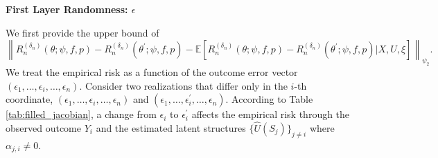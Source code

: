 \documentclass[12pt]{article}
\newcommand{\E}{\mathbb{E}}
\begin{document}
\noindent\textbf{First Layer Randomness: $\epsilon$}

\noindent We first provide the upper bound of 
$$\left\|R_n^{(\delta_n)}(\theta;\psi,f,p)-R_n^{({\delta_n})}(\theta^\prime;\psi,f,p)-\E\left[R_n^{(\delta_n)}(\theta;\psi,f,p)-R_n^{({\delta_n})}(\theta^\prime;\psi,f,p)|X,U,\xi\right]\right\|_{\psi_2}.$$
We treat the empirical risk as a function of the outcome error vector $(\epsilon_1, \ldots,\epsilon_i,\ldots, \epsilon_n)$. Consider two realizations that differ only in the $i$-th coordinate, $(\epsilon_1, \ldots,\epsilon_i,\ldots, \epsilon_n)$ and $(\epsilon_1, \ldots,\epsilon_i^\prime,\ldots, \epsilon_n)$. According to Table \ref{tab:filled_jacobian}, a change from $\epsilon_i$ to $\epsilon_i^\prime$ affects the empirical risk through the observed outcome $Y_i$ and the estimated latent structures $\{\widehat U(S_j)\}_{j\neq i}$ where $\alpha_{j,i}\neq 0$.  
\end{document}

